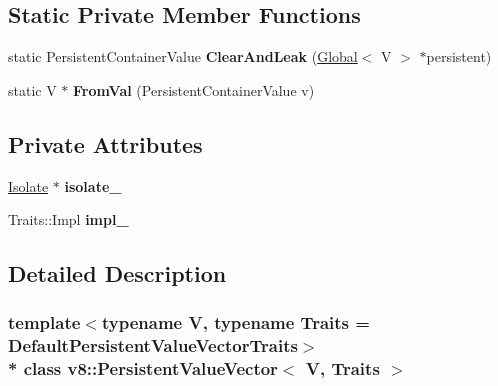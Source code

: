 \subsection*{Static Private Member Functions}
\begin{DoxyCompactItemize}
\item 
static Persistent\+Container\+Value {\bfseries Clear\+And\+Leak} (\hyperlink{classv8_1_1_global}{Global}$<$ V $>$ $\ast$persistent)\hypertarget{classv8_1_1_persistent_value_vector_a17d319e9935cb951900cbcf869c596d5}{}\label{classv8_1_1_persistent_value_vector_a17d319e9935cb951900cbcf869c596d5}

\item 
static V $\ast$ {\bfseries From\+Val} (Persistent\+Container\+Value v)\hypertarget{classv8_1_1_persistent_value_vector_a8ee50e074674ca91a3dc2370f1ddbf06}{}\label{classv8_1_1_persistent_value_vector_a8ee50e074674ca91a3dc2370f1ddbf06}

\end{DoxyCompactItemize}
\subsection*{Private Attributes}
\begin{DoxyCompactItemize}
\item 
\hyperlink{classv8_1_1_isolate}{Isolate} $\ast$ {\bfseries isolate\+\_\+}\hypertarget{classv8_1_1_persistent_value_vector_a8d7f3de6fa62cfaff370b2bdf72c638b}{}\label{classv8_1_1_persistent_value_vector_a8d7f3de6fa62cfaff370b2bdf72c638b}

\item 
Traits\+::\+Impl {\bfseries impl\+\_\+}\hypertarget{classv8_1_1_persistent_value_vector_ae6bad422949b86010a4c8791bb912eec}{}\label{classv8_1_1_persistent_value_vector_ae6bad422949b86010a4c8791bb912eec}

\end{DoxyCompactItemize}


\subsection{Detailed Description}
\subsubsection*{template$<$typename V, typename Traits = Default\+Persistent\+Value\+Vector\+Traits$>$\\*
class v8\+::\+Persistent\+Value\+Vector$<$ V, Traits $>$}

